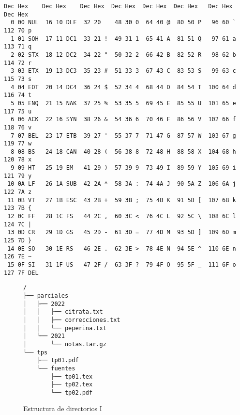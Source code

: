 \documentclass[12pt]{article}
\begin{document}
\begin{verbatim}
Dec Hex    Dec Hex    Dec Hex  Dec Hex  Dec Hex  Dec Hex   Dec Hex   Dec Hex
  0 00 NUL  16 10 DLE  32 20    48 30 0  64 40 @  80 50 P   96 60 `  112 70 p
  1 01 SOH  17 11 DC1  33 21 !  49 31 1  65 41 A  81 51 Q   97 61 a  113 71 q
  2 02 STX  18 12 DC2  34 22 "  50 32 2  66 42 B  82 52 R   98 62 b  114 72 r
  3 03 ETX  19 13 DC3  35 23 #  51 33 3  67 43 C  83 53 S   99 63 c  115 73 s
  4 04 EOT  20 14 DC4  36 24 $  52 34 4  68 44 D  84 54 T  100 64 d  116 74 t
  5 05 ENQ  21 15 NAK  37 25 %  53 35 5  69 45 E  85 55 U  101 65 e  117 75 u
  6 06 ACK  22 16 SYN  38 26 &  54 36 6  70 46 F  86 56 V  102 66 f  118 76 v
  7 07 BEL  23 17 ETB  39 27 '  55 37 7  71 47 G  87 57 W  103 67 g  119 77 w
  8 08 BS   24 18 CAN  40 28 (  56 38 8  72 48 H  88 58 X  104 68 h  120 78 x
  9 09 HT   25 19 EM   41 29 )  57 39 9  73 49 I  89 59 Y  105 69 i  121 79 y
 10 0A LF   26 1A SUB  42 2A *  58 3A :  74 4A J  90 5A Z  106 6A j  122 7A z
 11 0B VT   27 1B ESC  43 2B +  59 3B ;  75 4B K  91 5B [  107 6B k  123 7B {
 12 0C FF   28 1C FS   44 2C ,  60 3C <  76 4C L  92 5C \  108 6C l  124 7C |
 13 0D CR   29 1D GS   45 2D -  61 3D =  77 4D M  93 5D ]  109 6D m  125 7D }
 14 0E SO   30 1E RS   46 2E .  62 3E >  78 4E N  94 5E ^  110 6E n  126 7E ~
 15 0F SI   31 1F US   47 2F /  63 3F ?  79 4F O  95 5F _  111 6F o  127 7F DEL
\end{verbatim}

\begin{figure}
    \centering

\begin{verbatim}
/
├── parciales
│   ├── 2022
│   │   ├── citrata.txt
│   │   ├── correcciones.txt
│   │   └── peperina.txt
│   └── 2021
│       └── notas.tar.gz
└── tps
    ├── tp01.pdf
    └── fuentes
        ├── tp01.tex
        ├── tp02.tex
        └── tp02.pdf
\end{verbatim}

    \caption{Estructura de directorios I}

    \label{directorios}

\end{figure}
\end{document}
